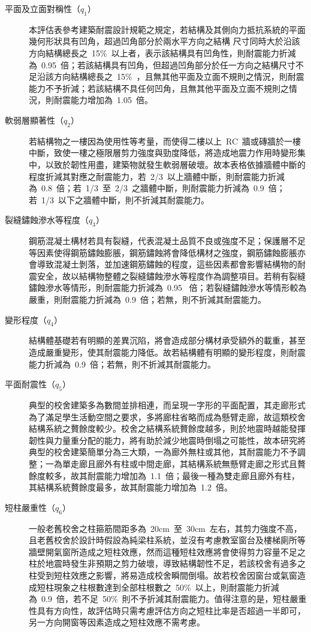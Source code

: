 \begin{description}
  \item[平面及立面對稱性（$q_1$）]
  本評估表參考建築耐震設計規範之規定，若結構及其側向力抵抗系統的平面幾何形狀具有凹角，超過凹角部分於兩水平方向之結構 尺寸同時大於沿該方向結構總長之~15\%~以上者，表示該結構具有凹角性，則耐震能力折減為~0.95~倍；若該結構具有凹角，但超過凹角部分於任一方向之結構尺寸不足沿該方向結構總長之~15\%~，且無其他平面及立面不規則之情況，則耐震能力不予折減；若該結構不具任何凹角，且無其他平面及立面不規則之情況，則耐震能力增加為~1.05~倍。
  \item[軟弱層顯著性（$q_2$）]
  若結構物之一樓因為使用性等考量，而使得二樓以上~RC~牆或磚牆於一樓中斷，致使一樓之極限層剪力強度與勁度降低，將造成地震力作用時變形集中，以致於韌性用盡，建築物就發生軟弱層破壞。故本表格依據牆體中斷的程度折減其對應之耐震能力，若~2/3~以上牆體中斷，則耐震能力折減為~0.8~倍；若~1/3~至~2/3~之牆體中斷，則耐震能力折減為~0.9~倍；若~1/3~以下之牆體中斷，則不折減其耐震能力。
  \item[裂縫鏽蝕滲水等程度（$q_3$）]
  鋼筋混凝土構材若具有裂縫，代表混凝土品質不良或強度不足；保護層不足等因素使得鋼筋鏽蝕膨脹，鋼筋鏽蝕將會降低構材之強度，鋼筋鏽蝕膨脹亦會導致混凝土剝落，並加速鋼筋鏽蝕的程度，這些因素都會影響結構物的耐震安全，故以結構物整體之裂縫鏽蝕滲水等程度作為調整項目。若稍有裂縫鏽蝕滲水等情形，則耐震能力折減為~0.95~ 倍；若裂縫鏽蝕滲水等情形較為嚴重，則耐震能力折減為~0.9~倍；若無，則不折減其耐震能力。
  \item[變形程度（$q_4$）]
  結構體基礎若有明顯的差異沉陷，將會造成部分構材承受額外的載重，甚至造成嚴重變形，使其耐震能力降低。故若結構體有明顯的變形程度，則耐震能力折減為~0.9~倍；若無，則不折減其耐震能力。
  \item[平面耐震性（$q_5$）]
  典型的校舍建築多為數間並排相連，而呈現一字形的平面配置，其走廊形式為了滿足學生活動空間之要求，多將廊柱省略而成為懸臂走廊，故這類校舍結構系統之贅餘度較少。校舍之結構系統贅餘度越多，則於地震時越能發揮韌性與力量重分配的能力，將有助於減少地震時倒塌之可能性，故本研究將典型的校舍建築簡單分為三大類，一為廊外無柱或其他，其耐震能力不予調整；一為單走廊且廊外有柱或中間走廊，其結構系統無懸臂走廊之形式且贅餘度較多，故其耐震能力增加為~1.1~倍；最後一種為雙走廊且廊外有柱，其結構系統贅餘度最多，故其耐震能力增加為~1.2~倍。
  \item[短柱嚴重性（$q_6$）]
  一般老舊校舍之柱箍筋間距多為~20cm~至~30cm~左右，其剪力強度不高，且老舊校舍於設計時假設為純梁柱系統，並沒有考慮教室窗台及樓梯廁所等牆壁開氣窗所造成之短柱效應，然而這種短柱效應將會使得剪力容量不足之柱於地震時發生非預期之剪力破壞，導致結構韌性不足，若該校舍有過多之柱受到短柱效應之影響，將易造成校舍瞬間倒塌。故若校舍因窗台或氣窗造成短柱現象之柱根數達到全部柱根數之~50\%~以上，則耐震能力折減為~0.9~倍，若不足~50\%~則不予折減其耐震能力。值得注意的是，短柱嚴重性具有方向性，故評估時只需考慮評估方向之短柱比率是否超過一半即可，另一方向開窗等因素造成之短柱效應不需考慮。
\end{description}



